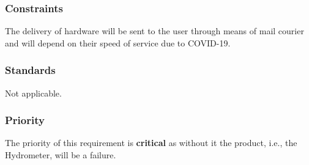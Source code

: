 \subsubsection{Constraints}
The delivery of hardware will be sent to the user through means of mail courier and will depend on their speed of service due to COVID-19.
\subsubsection{Standards}
Not applicable. 
\subsubsection{Priority}
The priority of this requirement is \textbf{critical} as without it the product, i.e., the Hydrometer, will be a failure.